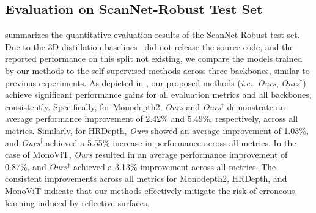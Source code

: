 \subsection{Evaluation on ScanNet-Robust Test Set}
 summarizes the quantitative evaluation results of the ScanNet-Robust test set.
Due to the 3D-distillation baselines~\citep{shi20233d} did not release the source code, and the reported performance on this split not existing, we compare the models trained by our methods to the self-supervised methods across three backbones, similar to previous experiments. As depicted in , our proposed methods (\textit{i.e.}, \textit{Ours}, \textit{Ours}$^{\dagger}$) achieve significant performance gains for all evaluation metrics and all backbones, consistently. 
Specifically, for Monodepth2, \textit{Ours} and \textit{Ours}$^{\dagger}$ demonstrate an average performance improvement of 2.42\% and 5.49\%, respectively, across all metrics. Similarly, for HRDepth, \textit{Ours} showed an average improvement of 1.03\%, and \textit{Ours}$^{\dagger}$ achieved a 5.55\% increase in performance across all metrics.
In the case of MonoViT, \textit{Ours} resulted in an average performance improvement of 0.87\%, and \textit{Ours}$^{\dagger}$ achieved a 3.13\% improvement across all metrics. 
The consistent improvements across all metrics for Monodepth2, HRDepth, and MonoViT indicate that our methods effectively mitigate the risk of erroneous learning induced by reflective surfaces.



